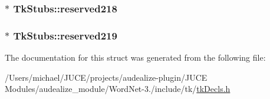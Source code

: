 \subsubsection[{\texorpdfstring{reserved218}{reserved218}}]{$\ast$ Tk\+Stubs\+::reserved218}\hypertarget{struct_tk_stubs_aaaa64061caa69206db19c2a818ab2de6}{}\label{struct_tk_stubs_aaaa64061caa69206db19c2a818ab2de6}
\subsubsection[{\texorpdfstring{reserved219}{reserved219}}]{$\ast$ Tk\+Stubs\+::reserved219}\hypertarget{struct_tk_stubs_aa20e10a582c6fe434d88073d5a21c7c9}{}\label{struct_tk_stubs_aa20e10a582c6fe434d88073d5a21c7c9}


The documentation for this struct was generated from the following file\+:\begin{DoxyCompactItemize}
\item 
/\+Users/michael/\+J\+U\+C\+E/projects/audealize-\/plugin/\+J\+U\+C\+E Modules/audealize\+\_\+module/\+Word\+Net-\/3./include/tk/\hyperlink{tk_decls_8h}{tk\+Decls.\+h}\end{DoxyCompactItemize}
